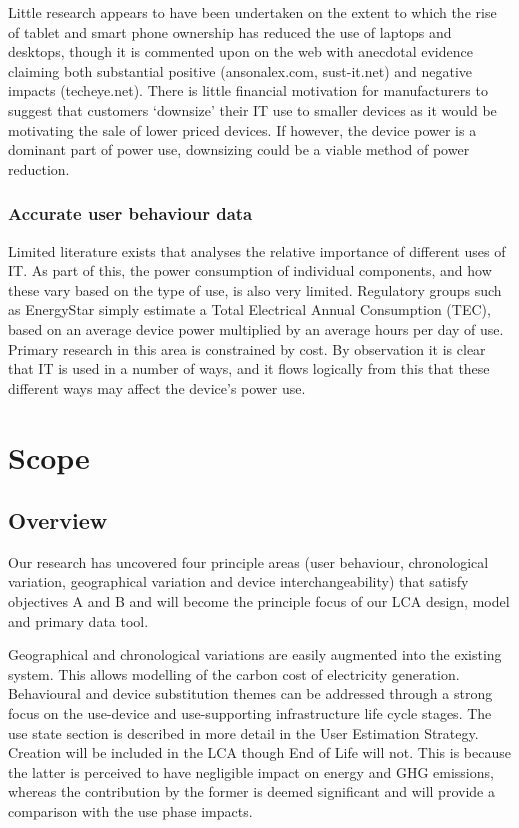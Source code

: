 \documentclass[conference]{IEEEtran}
\begin{document}
Little research appears to have been undertaken on the extent to which
the rise of tablet and smart phone ownership has reduced the use of
laptops and desktops, though it is commented upon on the web with
anecdotal evidence claiming both substantial positive (ansonalex.com,
sust-it.net) and negative impacts (techeye.net). There is little
financial motivation for manufacturers to suggest that customers
`downsize' their IT use to smaller devices as it would be motivating
the sale of lower priced devices. If however, the device power is a
dominant part of power use, downsizing could be a viable method of
power reduction.

\subsubsection{Accurate user behaviour data}

Limited literature exists that analyses the relative importance of
different uses of IT. As part of this, the power consumption of
individual components, and how these vary based on the type of use, is
also very limited. Regulatory groups such as EnergyStar simply
estimate a Total Electrical Annual Consumption (TEC), based on an
average device power multiplied by an average hours per day of
use. Primary research in this area is constrained by cost. By
observation it is clear that IT is used in a number of ways, and it
flows logically from this that these different ways may affect the
device’s power use.


\section{Scope}

\subsection{Overview}

Our research has uncovered four principle areas (user behaviour,
chronological variation, geographical variation and device
interchangeability) that satisfy objectives A and B and will become
the principle focus of our LCA design, model and primary data
tool.

Geographical and chronological variations are easily augmented into
the existing system. This allows modelling of the carbon cost of
electricity generation. Behavioural and device substitution themes can
be addressed through a strong focus on the use-device and
use-supporting infrastructure life cycle stages. The use state section
is described in more detail in the User Estimation Strategy. Creation
will be included in the LCA though End of Life will not. This is
because the latter is perceived to have negligible impact on energy
and GHG emissions, whereas the contribution by the former is deemed
significant and will provide a comparison with the use phase impacts.
\end{document}
